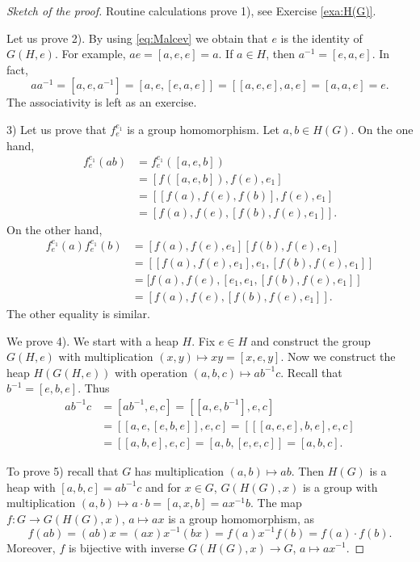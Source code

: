 \documentclass[graybox]{svmult}
\begin{document}
\begin{proof}[Sketch of the proof]
    Routine calculations prove 1), see Exercise \ref{exa:H(G)}. 
    
    Let us prove 2). By using \eqref{eq:Malcev} we obtain that $e$ is the identity of $G(H,e)$. For example,
    $ae=[a,e,e]=a$. If $a\in H$, then $a^{-1}=[e,a,e]$. In fact,
    \[
    aa^{-1}=[a,e,a^{-1}]=[a,e,[e,a,e]]=[[a,e,e],a,e]=[a,a,e]=e.
    \]
    The associativity is left as an exercise. 
    
    3) Let us prove that $f_e^{e_1}$ is a group homomorphism. Let $a,b\in H(G)$. On the one hand,
    \begin{align*}
    f_e^{e_1}(ab)&=f_e^{e_1}([a,e,b])\\
    &=[f([a,e,b]),f(e),e_1]\\
    &=[[f(a),f(e),f(b)],f(e),e_1]\\
    &=[f(a),f(e),[f(b),f(e),e_1]].
    \end{align*}
    On the other hand, 
    \begin{align*}
    f_e^{e_1}(a)f_e^{e_1}(b)&=[f(a),f(e),e_1][f(b),f(e),e_1]\\
    &=[[f(a),f(e),e_1],e_1,[f(b),f(e),e_1]]\\
    &=[f(a),f(e),[e_1,e_1,[f(b),f(e),e_1]]\\
    &=[f(a),f(e),[f(b),f(e),e_1]].
    \end{align*}
    The other equality is similar. 
    
    We prove 4). We start with a heap $H$. 
    Fix $e\in H$ and construct the group $G(H,e)$ with
    multiplication $(x,y)\mapsto xy=[x,e,y]$. Now we construct the heap
    $H(G(H,e))$ with operation $(a,b,c)\mapsto ab^{-1}c$. Recall that 
    $b^{-1}=[e,b,e]$. Thus 
    \begin{align*}
        ab^{-1}c 
        &= [ab^{-1}, e, c]
        = [[a,e,b^{-1}],e,c]\\
        &= [[a,e,[e,b,e]],e,c]
        = [[[a,e,e],b,e],e,c]\\
        &= [[a,b,e],e,c]
        = [a,b,[e,e,c]]
        = [a,b,c].
    \end{align*}
    
    To prove 5) recall that $G$ has multiplication $(a,b)\mapsto ab$. 
    Then $H(G)$ is a heap with $[a,b,c]=ab^{-1}c$ and for $x\in G$, 
    $G(H(G),x)$ is a group with
    multiplication $(a,b)\mapsto a\cdot b=[a,x,b]=ax^{-1}b$. The 
    map $f\colon G\to G(H(G),x)$, $a\mapsto ax$ is a group homomorphism, as 
    \[
    f(ab)=(ab)x=(ax)x^{-1}(bx)=f(a)x^{-1}f(b)=f(a)\cdot f(b).
    \]
    Moreover, $f$ is bijective with inverse $G(H(G),x)\to G$, $a\mapsto ax^{-1}$. 
\end{proof}
\end{document}
